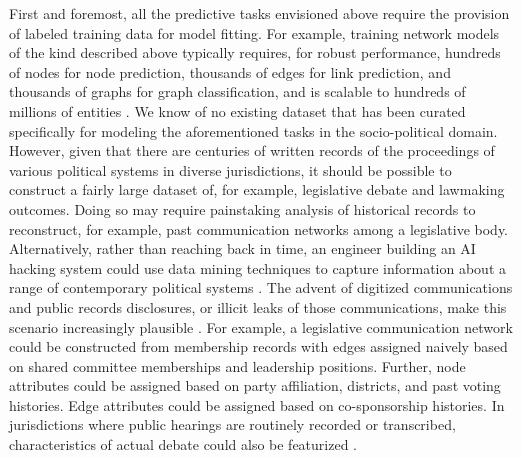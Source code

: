 \documentclass[nonacm,12pt]{acmart}
\begin{document}
First and foremost, all the predictive tasks envisioned above require the provision of labeled training data for model fitting. 
For example, training network models of the kind described above typically requires, for robust performance, hundreds of nodes for node prediction, thousands of edges for link prediction, and thousands of graphs for graph classification, and is scalable to hundreds of millions of entities \cite{hu_open_2020}. 
We know of no existing dataset that has been curated specifically for modeling the aforementioned tasks in the socio-political domain.  
However, given that there are centuries of written records of the proceedings of various political systems in diverse jurisdictions, it should be possible to construct a fairly large dataset of, for example, legislative debate and lawmaking outcomes.  
Doing so may require painstaking analysis of historical records to reconstruct, for example, past communication networks among a legislative body. 
Alternatively, rather than reaching back in time, an engineer building an AI hacking system could use data mining techniques to capture information about a range of contemporary political systems \cite{adnan_analytical_2019}.  
The advent of digitized communications and public records disclosures, or illicit leaks of those communications, make this scenario increasingly plausible \cite{stray_making_2019}.  
For example, a legislative communication network could be constructed from membership records with edges assigned naively based on shared committee memberships and leadership positions.  
Further, node attributes could be assigned based on party affiliation, districts, and past voting histories.  
Edge attributes could be assigned based on co-sponsorship histories.  
In jurisdictions where public hearings are routinely recorded or transcribed, characteristics of actual debate could also be featurized \cite{ruprechter_deconstructing_2020}.
\end{document}
